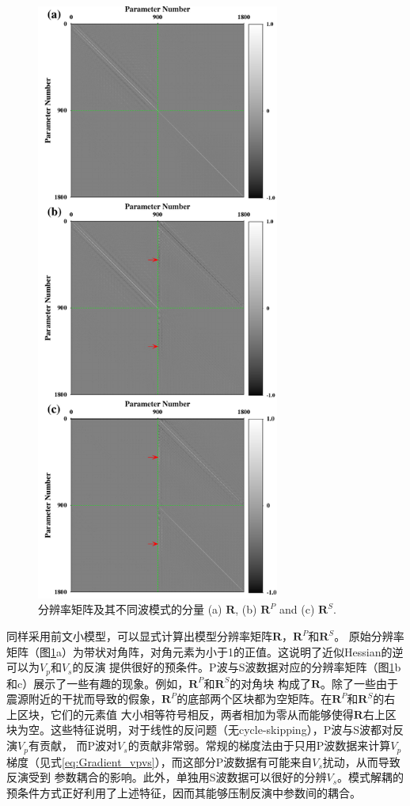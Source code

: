 \begin{figure}[!bht]
    \begin{center}
        \includegraphics[width=8cm]{Figure/chapter02/ResoOpera/Fig/resolutionoriginal.pdf}
        \caption{
分辨率矩阵及其不同波模式的分量
(a) $\mathbf{R}$, (b) $\mathbf{R}^P$ and (c) $\mathbf{R}^S$.
    }
    \label{fig:Resolution}
    \end{center}
\end{figure}
同样采用前文小模型，可以显式计算出模型分辨率矩阵$\mathbf{R}$，$\mathbf{R}^P$和$\mathbf{R}^S$。
原始分辨率矩阵（图\ref{fig:Resolution}a）为带状对角阵，对角元素为小于1的正值。这说明了近似Hessian的逆可以为$V_p$和$V_s$的反演
提供很好的预条件。P波与S波数据对应的分辨率矩阵（图\ref{fig:Resolution}b和c）展示了一些有趣的现象。例如，$\mathbf{R}^P$和$\mathbf{R}^S$的对角块
构成了$\mathbf{R}$。除了一些由于震源附近的干扰而导致的假象，$\mathbf{R}^P$的底部两个区块都为空矩阵。在$\mathbf{R}^P$和$\mathbf{R}^S$的右上区块，它们的元素值
大小相等符号相反，两者相加为零从而能够使得$\mathbf{R}$右上区块为空。这些特征说明，对于线性的反问题（无cycle-skipping），P波与S波都对反演$V_p$有贡献，
而P波对$V_s$的贡献非常弱。常规的梯度法由于只用P波数据来计算$V_p$梯度（见式\ref{eq:Gradient_vpvs}），而这部分P波数据有可能来自$V_s$扰动，从而导致反演受到
参数耦合的影响。此外，单独用S波数据可以很好的分辨$V_s$。模式解耦的预条件方式正好利用了上述特征，因而其能够压制反演中参数间的耦合。
